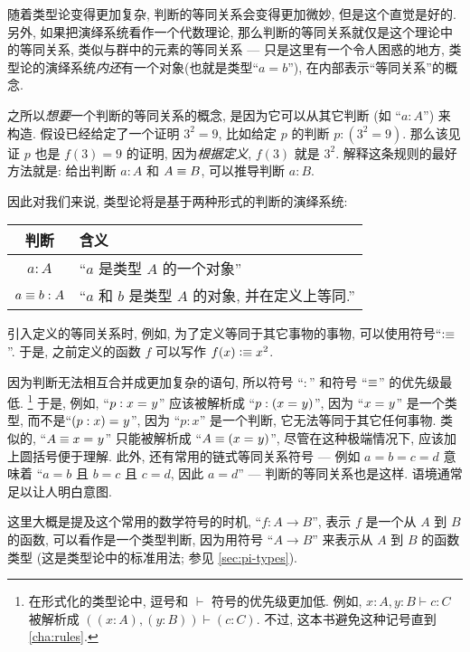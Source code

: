 随着类型论变得更加复杂, 判断的等同关系会变得更加微妙, 但是这个直觉是好的.
另外, 如果把演绎系统看作一个代数理论, 那么判断的等同关系就仅是这个理论中的等同关系, 类似与群中的元素的等同关系 ---
只是这里有一个令人困惑的地方, 类型论的演绎系统\emph{内}\emph{还}有一个对象(也就是类型``$a=b$''), 在内部表示``等同关系''的概念.

之所以\emph{想要}一个判断的等同关系的概念, 是因为它可以从其它判断 (如 ``$a:A$'') 来构造.
假设已经给定了一个证明 $3^2=9$, 比如给定 $p$ 的判断 $p:(3^2=9)$.
那么该见证 $p$ 也是 $f(3)=9$ 的证明, 因为\emph{根据定义}, $f(3)$ 就是 $3^2$.
解释这条规则的最好方法就是: 给出判断 $a:A$ 和 $A\equiv B$, 可以推导判断 $a:B$.

因此对我们来说, 类型论将是基于两种形式的判断的演绎系统:
\begin{center}
    \medskip
    \begin{tabular}{cl}
        \toprule
        判断              & 含义                                \\
        \midrule
        $a : A$         & ``$a$ 是类型 $A$ 的一个对象''             \\
        $a \equiv b : A$ & ``$a$ 和 $b$ 是类型 $A$ 的对象, 并在定义上等同.'' \\
        \bottomrule
    \end{tabular}
    \medskip
\end{center}%
%
引入定义的等同关系时, 例如, 为了定义等同于其它事物的事物, 可以使用符号``$\vcentcolon\equiv$''.
于是, 之前定义的函数 $f$ 可以写作 $f(x)\vcentcolon\equiv x^2$.

因为判断无法相互合并成更加复杂的语句, 所以符号 ``$:$'' 和符号 ``$\equiv$'' 的优先级最低.
\footnote{在形式化的类型论中, 逗号和 $\vdash$ 符号的优先级更加低.
例如, $x:A,y:B\vdash c:C$ 被解析成 $((x:A),(y:B))\vdash (c:C)$.
不过, 这本书避免这种记号直到 \cref{cha:rules}.}
于是, 例如, ``$p:x =_{} y$'' 应该被解析成 ``$p:(x =_{} y)$'', 因为 ``$x =_{} y$'' 是一个类型, 而不是``$(p:x) =_{} y$'', 因为 ``$p:x$'' 是一个判断, 它无法等同于其它任何事物.
类似的, ``$A\equiv x =_{} y$'' 只能被解析成 ``$A\equiv(x =_{} y)$'', 尽管在这种极端情况下, 应该加上圆括号便于理解.
此外, 还有常用的链式等同关系符号 --- 例如 $a=b=c=d$ 意味着 ``$a=b$ 且 $b=c$ 且 $c=d$, 因此 $a=d$'' --- 判断的等同关系也是这样.
语境通常足以让人明白意图.

这里大概是提及这个常用的数学符号的时机, ``$f:A\to B$'', 表示 $f$ 是一个从 $A$ 到 $B$ 的函数, 可以看作是一个类型判断, 因为用符号 ``$A\to B$'' 来表示从 $A$ 到 $B$ 的函数类型
(这是类型论中的标准用法;
参见 \cref{sec:pi-types}).

